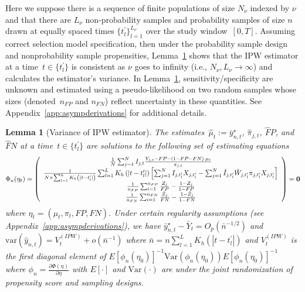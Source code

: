 \documentclass[11pt]{amsart}
\numberwithin{equation}{section}
\theoremstyle{plain}
\newtheorem{lemma}[theorem]{Lemma}
\begin{document}
 Here we suppose there is a sequence of finite populations of size $N_{\nu}$ indexed by $\nu$ and that there are $L_\nu$ non-probability samples and probability samples of size $n$ drawn at equally spaced times $\{ t^\prime_l \}_{l=1}^{L_{\nu}}$ over the study window~$[0,T]$. Assuming correct selection model specification, then under the probability sample design and nonprobability sample propensities, Lemma~\ref{lemma:ipw} shows that the IPW estimator at a time~$t \in \{ t^\prime_l \}$ is consistent as $\nu$ goes to infinity (i.e., $N_{\nu}, L_{\nu} \to \infty$) and calculates the estimator's variance.  In Lemma~\ref{lemma:ipw}, sensitivity/specificity are unknown and estimated using a pseudo-likelihood on two random samples whose sizes (denoted~$n_{FP}$ and $n_{FN}$) reflect uncertainty in these quantities.  See Appendix~\ref{app:asympderivations} for additional details.

 \begin{lemma}[Variance of IPW estimator] \normalfont
 \label{lemma:ipw}
The estimates~$\hat \mu_t := \bar y_{n,t}^\star$, $\hat \pi_{j,t}$, $\hat FP$, and $\hat FN$ at a time~$t \in \{t_l^\prime\}$ are solutions to the following set of estimating equations
 $$
 \Phi_n (\eta_t) =
 \left (
 \begin{array}{c}
 \frac{1}{N} \sum_{j=1}^N I_{j,t} \frac{Y_{j,t} - FP - (1-FP-FN) \cdot \mu_t}{\pi_{j,t}} \\
 \frac{1}{N \times \sum_{l = 1}^L K_h \left(|t - t_l^\prime| \right)} \sum_{l = 1}^L K_h \left(|t - t_l^\prime| \right) \left[ \sum_{j=1}^N I_{j,t_l^\prime} X_{j,t_l^\prime} - \sum_{j = 1}^N \tilde I_{j,t_l^\prime} \tilde W_{j,t_l^\prime}  \pi_{j,t_l^\prime} X_{j,t_l^\prime}  \right] \\
 \frac{1}{n_{FP}} \sum_{i=1}^{n_{FP}} \frac{Z_j}{FP} - \frac{1-Z_j}{1-FP} \\
 \frac{1}{n_{FN}} \sum_{i=1}^{n_{FN}} \frac{\tilde Z_j}{FN} - \frac{1-\tilde Z_j}{1-FN} \\
 \end{array}
 \right ) = {\bf 0}
 $$
 where $\eta_t = (\mu_t, \pi_t, FP, FN)$. Under certain regularity assumptions (see Appendix~\ref{app:asympderivations}), we have $\bar y_{n,t}^\star - \bar Y_{t} = O_p (\bar n^{-1/2})$  and $\text{var} (\hat y_{n,t}) = V_{t}^{(IPW)} + o (\bar n^{-1})$ where $\bar n = n \sum_{l=1}^L K_{h} (|t - t_l^\prime|)$ and $V_t^{(IPW)}$ is the first diagonal element of $E [\phi_n(\eta_0)]^{-1} \text{Var}(\phi_n(\eta_0))E [\phi_n(\eta_0)]^{-1}$ where $\phi_n = \frac{\partial \Phi (\eta)}{\partial \eta}$ with $E[\cdot]$ and $\text{Var} (\cdot)$ are under the joint randomization of propensity score and sampling designs.
 \end{lemma}
\end{document}
